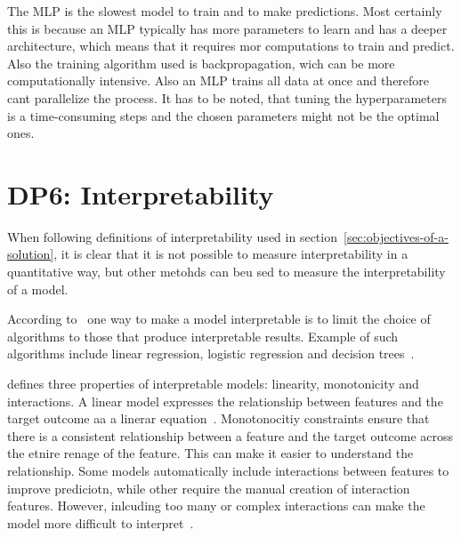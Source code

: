 The \ac{MLP} is the slowest model to train and to make predictions.
Most certainly this is because an \ac{MLP} typically has more parameters to learn and
has a deeper architecture, which means that it requires mor computations to train and
predict.
Also the training algorithm used is backpropagation, wich can be more computationally
intensive.
Also an \ac{MLP} trains all data at once and therefore cant parallelize the process.
It has to be noted, that tuning the hyperparameters is a time-consuming steps and the
chosen parameters might not be the optimal ones.


\section{DP6: Interpretability}\label{sec:interpretability}

When following definitions of interpretability used in
section~\ref{sec:objectives-of-a-solution}, it is clear that it is not possible to
measure interpretability in a quantitative way, but other metohds can beu sed to measure the
interpretability of a model.


According to~\cite{molnar2020interpretable} one way to make a model interpretable is to limit the
choice of algorithms to those that produce interpretable results.
Example of such algorithms include linear regression, logistic regression and decision
trees~\cite[p. 35]{molnar2020interpretable}.

\cite{molnar2020interpretable} defines three properties of interpretable models: linearity,
monotonicity and interactions.
A linear model expresses the relationship between features and the target outcome aa a linerar
equation~\cite[]{molnar2020interpretable}.
Monotonocitiy constraints ensure that there is a consistent relationship between a feature and
the target outcome across the etnire renage of the feature. This can make it easier to understand
the relationship.
Some models automatically include interactions between features to improve prediciotn, while
other require the manual creation of interaction features. However, inlcuding too many or complex
interactions can make the model more difficult to interpret~\cite{molnar2020interpretable}.

